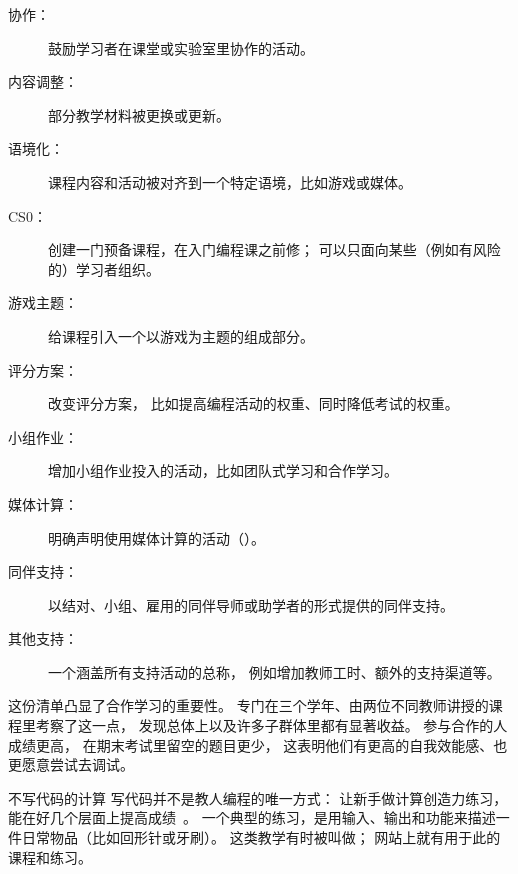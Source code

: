 \begin{description}

\item[协作：]
  鼓励学习者在课堂或实验室里协作的活动。

\item[内容调整：]
  部分教学材料被更换或更新。

\item[语境化：]
  课程内容和活动被对齐到一个特定语境，比如游戏或媒体。

\item[CS0：]
  创建一门预备课程，在入门编程课之前修；
  可以只面向某些（例如有风险的）学习者组织。

\item[游戏主题：]
  给课程引入一个以游戏为主题的组成部分。

\item[评分方案：]
  改变评分方案，
  比如提高编程活动的权重、同时降低考试的权重。

\item[小组作业：]
  增加小组作业投入的活动，比如团队式学习和合作学习。

\item[媒体计算：]
  明确声明使用媒体计算的活动（）。

\item[同伴支持：]
  以结对、小组、雇用的同伴导师或助学者的形式提供的同伴支持。

\item[其他支持：]
  一个涵盖所有支持活动的总称，
  例如增加教师工时、额外的支持渠道等。

\end{description}


这份清单凸显了合作学习的重要性。
\cite{Beck2013}专门在三个学年、由两位不同教师讲授的课程里考察了这一点，
发现总体上以及许多子群体里都有显著收益。
参与合作的人成绩更高，
在期末考试里留空的题目更少，
这表明他们有更高的自我效能感、也更愿意尝试去调试。

\begin{aside}{不写代码的计算}
  写代码并不是教人编程的唯一方式：
  让新手做计算创造力练习，能在好几个层面上提高成绩~\cite{Shel2017}。
  一个典型的练习，是用输入、输出和功能来描述一件日常物品（比如回形针或牙刷）。
  这类教学有时被叫做；
   网站上就有用于此的课程和练习。
\end{aside}

